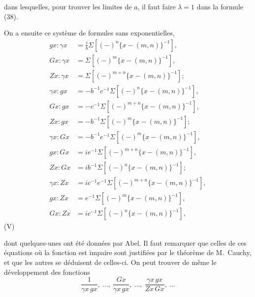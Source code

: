 \documentclass[12pt,a4paper]{article}
\begin{document}
\noindent dans lesquelles, pour trouver les limites de $a$, il faut faire $\lambda = 1$ dans la formule (38).

On a ensuite ce syst\`eme de formules sans exponentielles,
\begin{align*}
gx : \gamma x &= \tfrac{i}{b}\Sigma[(-)^{n}\{x - (m,n)\}^{-1}],\\
Gx : \gamma x &= \Sigma[(-)^{m}\{x - (m,n)\}^{-1}],\\
Zx : \gamma x &= \Sigma[(-)^{m+n}\{x - (m,n)\}^{-1}];\\
\gamma x : gx &= -b^{-1}c^{-1}\Sigma[(-)^{n}\{x - (m,n)\}^{-1}],\\
Gx : gx &= -c^{-1}\Sigma[(-)^{m+n}\{x - (m,n)\}^{-1}],\\
Zx : gx &= -b^{-1}\Sigma[(-)^{m}\{x - (m,n)\}^{-1}];\\
\gamma x : Gx &= -b^{-1}e^{-1}\Sigma[(-)^{m}\{x - (m,n)\}^{-1}],\\
gx : Gx &= ie^{-1}\Sigma[(-)^{m+n}\{x - (m,n)\}^{-1}],\\
Zx : Gx &= ib^{-1}\Sigma[(-)^{n}\{x - (m,n)\}^{-1}];\\
\gamma x : Zx &= ic^{-1}e^{-1}\Sigma[(-)^{m+n}\{x - (m,n)\}^{-1}],\\
gx : Zx &= e^{-1}\Sigma[(-)^{m}\{x - (m,n)\}^{-1}],\\
Gx : Zx &= ic^{-1}\Sigma[(-)^{n}\{x - (m,n)\}^{-1}],
\end{align*}
\hfill (V)

\noindent dont quelques-unes ont \'et\'e donn\'ees par Abel. Il faut remarquer que celles de ces \'equations o\`u la fonction est impaire sont justifi\'ees par le th\'eor\`eme de M.~Cauchy, et que les autres se d\'eduisent de celles-ci. On peut trouver de m\^eme le d\'eveloppement des fonctions
\[
\frac{1}{\gamma x\, gx},\ \dots,\ \frac{Gx}{\gamma x\, gx},\ \dots,\ \frac{\gamma x\, gx}{Zx\, Gx},\ \dots
\]

\newpage
\setcounter{page}{178}
\end{document}
